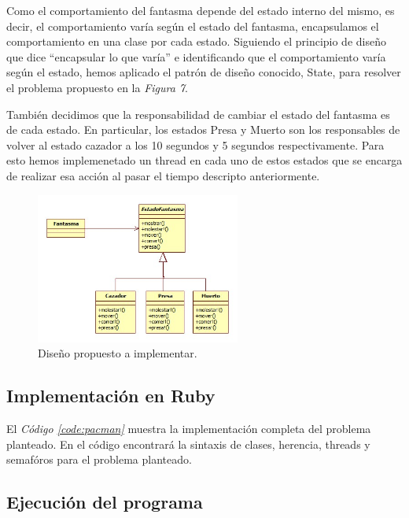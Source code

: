 \documentclass{article}
\newcommand{\refcode}[1]{\textit{Código \ref{#1}}}
\begin{document}
	Como el comportamiento del fantasma depende del estado interno del mismo, es decir, el comportamiento varía según el estado del fantasma, encapsulamos el comportamiento en una clase por cada estado. Siguiendo el principio de diseño que dice ``encapsular lo que varía'' e identificando que el comportamiento varía según el estado, hemos aplicado el patrón de diseño conocido, State, para resolver el problema propuesto en la \textit{Figura 7}.
	\par
	También decidimos que la responsabilidad de cambiar el estado del fantasma es de cada estado. En particular, los estados Presa y Muerto son los responsables de volver al estado cazador a los 10 segundos y 5 segundos respectivamente. Para esto hemos implemenetado un thread en cada uno de estos estados que se encarga de realizar esa acción al pasar el tiempo descripto anteriormente. 


\begin{figure}[!htb]
	\centering
	\includegraphics[width=0.60\textwidth]{images/ejemplo/Diseno.jpg}
	\caption{Diseño propuesto a implementar.}
	\bigskip
	\bigskip
\end{figure}



\subsection{Implementación en Ruby}

	El \refcode{code:pacman} muestra la implementación completa del problema planteado. En el código encontrará la sintaxis de clases, herencia, threads y semafóros para el problema planteado.

 
\bigskip\bigskip



\subsection{Ejecución del programa}
\end{document}
